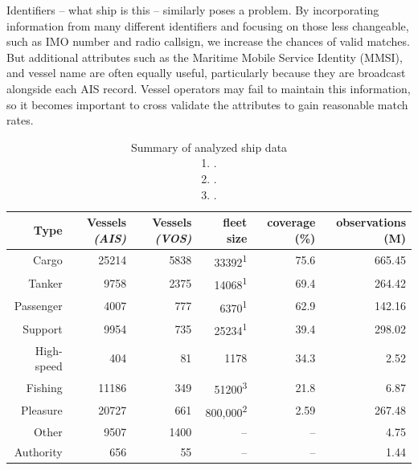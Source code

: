 \documentclass[12pt,letterpaper]{article}
\begin{document}
Identifiers -- what ship is this -- similarly poses a problem. By incorporating information from many different identifiers and focusing on those less changeable, such as IMO number and radio callsign, we increase the chances of valid matches. But additional attributes such as the Maritime Mobile Service Identity (MMSI), and vessel name are often equally useful, particularly because they are broadcast alongside each AIS record. Vessel operators may fail to maintain this information, so it becomes important to cross validate the attributes to gain reasonable match rates.


\begin{table}[htbp]
  \begin{tabular}{rrrrrr} %
    \hline
    Type & Vessels \textit{(AIS)} & Vessels \textit{(VOS)} & fleet size & coverage (\%) & observations (M) \\
    \hline
    Cargo & 25214 & 5838 & 33392\textsuperscript{1} & 75.6 & 665.45 \\
    Tanker & 9758 & 2375 & 14068\textsuperscript{1} & 69.4 & 264.42 \\
    Passenger & 4007 & 777 & 6370\textsuperscript{1} & 62.9 & 142.16 \\
    Support & 9954 & 735 & 25234\textsuperscript{1} & 39.4 & 298.02 \\
    High-speed & 404 & 81 & 1178 & 34.3 & 2.52 \\
    Fishing & 11186 & 349 & 51200\textsuperscript{3} & 21.8 & 6.87 \\
    Pleasure & 20727 & 661 & 800,000\textsuperscript{2} & 2.59 & 267.48 \\
    Other & 9507 & 1400 & -- & -- & 4.75 \\
    Authority & 656 & 55 & -- & -- & 1.44 \\
  \end{tabular}
  \caption{Summary of analyzed ship data\\
  1. \cite{Equasis2011}.\\
  2. \cite{westwood2001global}.\\
  3. \cite{FAOfishing}.}
  \label{table:ships-by-type}
\end{table}
\end{document}

